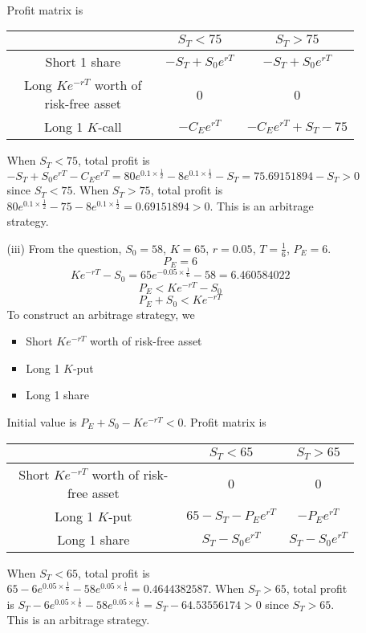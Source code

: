 \documentclass{article}
\begin{document}
\begin{enumerate}
\begin{itemize}
\begin{itemize}
\\
Profit matrix is
\begin{center}
\begin{tabular} { |c|c|c| }
\hline
 & $S_T<75$ & $S_T>75$ \\
 \hline
 Short 1 share & $-S_T+S_0e^{rT}$ & $-S_T+S_0e^{rT}$ \\
 \hline
 Long $Ke^{-rT}$ worth of risk-free asset & 0 & 0 \\
 \hline
 Long 1 $K$-call & $-C_Ee^{rT}$ & $-C_Ee^{rT}+S_T-75$ \\
 \hline
 \end{tabular}
\end{center}
When $S_T<75$, total profit is $-S_T+S_0e^{rT}-C_Ee^{rT}=80e^{0.1\times \frac{1}{2}}-8e^{0.1\times \frac{1}{2}}-S_T=75.69151894-S_T>0$ since $S_T<75$.
\newline
When $S_T>75$, total profit is $80e^{0.1\times \frac{1}{2}}-75-8e^{0.1\times \frac{1}{2}}=0.69151894>0$.
\newline
This is an arbitrage strategy.\\
\item[(iii)]
From the question, $S_0=58$, $K=65$, $r=0.05$, $T=\frac{1}{6}$, $P_E=6$.
\[P_E=6\]
\[Ke^{-rT}-S_0=65e^{-0.05\times \frac{1}{6}}-58=6.460584022\]
\[P_E<Ke^{-rT}-S_0\]
\[P_E+S_0<Ke^{-rT}\]
To construct an arbitrage strategy, we
\begin{itemize}
    \item Short $Ke^{-rT}$ worth of risk-free asset
    \item Long 1 $K$-put
    \item Long 1 share
\end{itemize}
Initial value is $P_E+S_0-Ke^{-rT}<0$.
\newline
Profit matrix is
\begin{center}
\begin{tabular} { |c|c|c| }
\hline
 & $S_T<65$ & $S_T>65$ \\
 \hline
 Short $Ke^{-rT}$ worth of risk-free asset & 0 & 0 \\
 \hline
 Long 1 $K$-put & $65-S_T-P_Ee^{rT}$ & $-P_Ee^{rT}$ \\
 \hline
 Long 1 share & $S_T-S_0e^{rT}$ & $S_T-S_0e^{rT}$ \\
 \hline
 \end{tabular}
\end{center}
When $S_T<65$, total profit is $65-6e^{0.05 \times \frac{1}{6}}-58e^{0.05 \times \frac{1}{6}}=0.4644382587$.
\newline
When $S_T>65$, total profit is $S_T-6e^{0.05 \times \frac{1}{6}}-58e^{0.05 \times \frac{1}{6}}=S_T-64.53556174>0$ since $S_T>65$.
\newline
This is an arbitrage strategy.
\end{itemize}
\end{itemize}
\end{enumerate}
\end{document}
